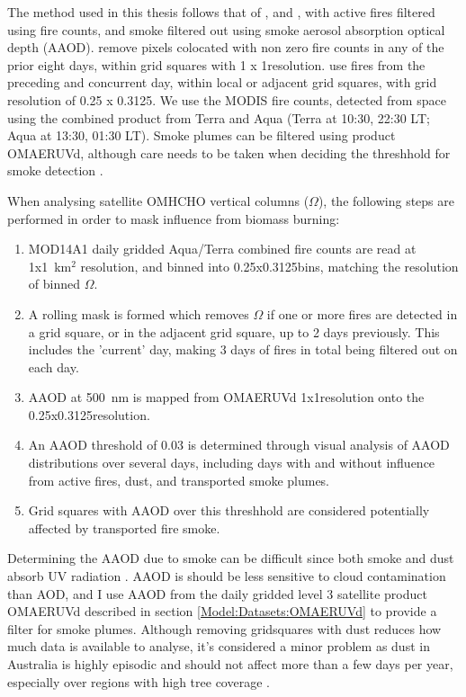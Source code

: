     The method used in this thesis follows that of \textcite{Marais2012}, and \textcite{Barkley2013}, with active fires filtered using fire counts, and smoke filtered out using smoke aerosol absorption optical depth (AAOD).
    \citet{Marais2012} remove pixels colocated with non zero fire counts in any of the prior eight days, within grid squares with 1 x 1\degr resolution.
    \citet{Barkley2013} use fires from the preceding and concurrent day, within local or adjacent grid squares, with grid resolution of 0.25 x 0.3125\degr.
    We use the MODIS fire counts, detected from space using the combined product from Terra and Aqua (Terra at 10:30, 22:30 LT; Aqua at 13:30, 01:30 LT).
    Smoke plumes can be filtered using product OMAERUVd, although care needs to be taken when deciding the threshhold for smoke detection \parencite{Marais2012}.
    
    When analysing satellite OMHCHO vertical columns ($\Omega$), the following steps are performed in order to mask influence from biomass burning:
    \begin{enumerate}
      \item MOD14A1 daily gridded Aqua/Terra combined fire counts are read at 1x1~km$^2$ resolution, and binned into 0.25x0.3125\degr bins, matching the resolution of binned $\Omega$.
      \item A rolling mask is formed which removes $\Omega$ if one or more fires are detected in a grid square, or in the adjacent grid square, up to 2 days previously.
      This includes the 'current' day, making 3 days of fires in total being filtered out on each day.
      \item AAOD at 500~nm is mapped from OMAERUVd 1x1\degr resolution onto the 0.25x0.3125\degr resolution.
      \item An AAOD threshold of 0.03 is determined through visual analysis of AAOD distributions over several days, including days with and without influence from active fires, dust, and transported smoke plumes.
      \item Grid squares with AAOD over this threshhold are considered potentially affected by transported fire smoke.
    \end{enumerate}
  
    Determining the AAOD due to smoke can be difficult since both smoke and dust absorb UV radiation \parencite{Ahn2008,Marais2012}.
    AAOD is should be less sensitive to cloud contamination than AOD, and I use AAOD from the daily gridded level 3 satellite product OMAERUVd \parencite{Ahn2008} described in section \ref{Model:Datasets:OMAERUVd} to provide a filter for smoke plumes.
    Although removing gridsquares with dust reduces how much data is available to analyse, it's considered a minor problem as dust in Australia is highly episodic and should not affect more than a few days per year, especially over regions with high tree coverage \parencite{Shao2007}.
    
